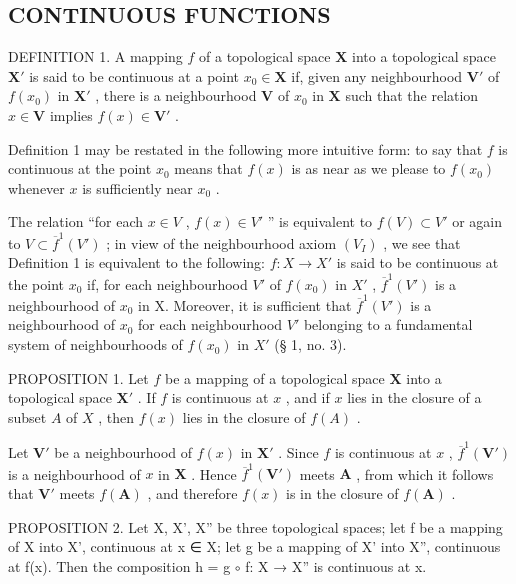 \subsection{CONTINUOUS FUNCTIONS}

DEFINITION 1. A mapping \(f\) of a topological space \(\mathbf{X}\) into a topological space \(\mathbf{X}'\) is said to be continuous at a point \(x_0 \in \mathbf{X}\) if, given any neighbourhood \(\mathbf{V}'\) of \(f(x_0)\) in \(\mathbf{X}'\) , there is a neighbourhood \(\mathbf{V}\) of \(x_0\) in \(\mathbf{X}\) such that the relation \(x \in \mathbf{V}\) implies \(f(x) \in \mathbf{V}'\) .

Definition 1 may be restated in the following more intuitive form: to say that \(f\) is continuous at the point \(x_0\) means that \(f(x)\) is as near as we please to \(f(x_0)\) whenever \(x\) is sufficiently near \(x_0\) .

The relation ``for each \(x \in V\) , \(f(x) \in V'\) '' is equivalent to \(f(V) \subset V'\) or again to \(V \subset \overline{f}^{1}(V')\) ; in view of the neighbourhood axiom \((V_{I})\) , we see that Definition 1 is equivalent to the following: \(f: X \to X'\) is said to be continuous at the point \(x_{0}\) if, for each neighbourhood \(V'\) of \(f(x_{0})\) in \(X'\) , \(\overline{f}^{1}(V')\) is a neighbourhood of \(x_{0}\) in X. Moreover, it is sufficient that \(\overline{f}^{1}(V')\) is a neighbourhood of \(x_{0}\) for each neighbourhood \(V'\) belonging to a fundamental system of neighbourhoods of \(f(x_{0})\) in \(X'\) (§ 1, no. 3).

PROPOSITION 1. Let \(f\) be a mapping of a topological space \(\mathbf{X}\) into a topological space \(\mathbf{X}'\) . If \(f\) is continuous at \(x\) , and if \(x\) lies in the closure of a subset \(A\) of \(X\) , then \(f(x)\) lies in the closure of \(f(A)\) .

Let \(\mathbf{V}'\) be a neighbourhood of \(f(x)\) in \(\mathbf{X}'\) . Since \(f\) is continuous at \(x\) , \(\overline{f}^1 (\mathbf{V}')\) is a neighbourhood of \(x\) in \(\mathbf{X}\) . Hence \(\overline{f}^1 (\mathbf{V}')\) meets \(\mathbf{A}\) , from which it follows that \(\mathbf{V}'\) meets \(f(\mathbf{A})\) , and therefore \(f(x)\) is in the closure of \(f(\mathbf{A})\) .

PROPOSITION 2. Let X, X', X'' be three topological spaces; let f be a mapping of X into X', continuous at x ∈ X; let g be a mapping of X' into X'', continuous at f(x). Then the composition h = g \(\circ\) f: X → X'' is continuous at x.

